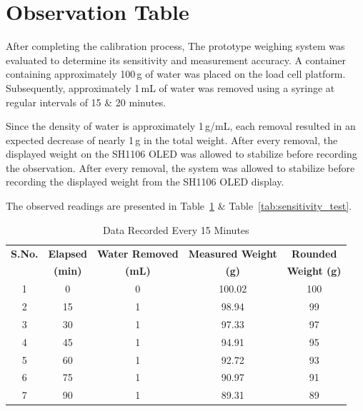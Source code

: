 \section{Observation Table}
After completing the calibration process, The prototype weighing system was evaluated to determine its sensitivity and measurement accuracy. A container containing approximately 100\,g of water was placed on the load cell platform. Subsequently, approximately 1\,mL of water was removed using a syringe at regular intervals of 15 \& 20 minutes.

Since the density of water is approximately 1\,g/mL, each removal resulted in an expected decrease of nearly 1\,g in the total weight. After every removal, the displayed weight on the SH1106 OLED was allowed to stabilize before recording the observation. After every removal, the system was allowed to stabilize before recording the displayed weight from the SH1106 OLED display.

The observed readings are presented in Table~\ref{tab:observation} \& Table~\ref{tab:sensitivity_test}.

\begin{table}[H]
\centering
\caption{Data Recorded Every 15 Minutes}
\label{tab:observation}

\begin{tabular}{|c|c|c|c|c|}
\hline
\textbf{S.No.} &
\textbf{Elapsed} &
\textbf{Water Removed} &
\textbf{Measured Weight} &
\textbf{Rounded} \\

&
\textbf{(min)} &
\textbf{(mL)} &
\textbf{(g)} &
\textbf{Weight (g)}\\
\hline

1 & 0  & 0 & 100.02 & 100 \\
2 & 15 & 1 & 98.94  & 99 \\
3 & 30 & 1 & 97.33  & 97 \\
4 & 45 & 1 & 94.91  & 95 \\
5 & 60 & 1 & 92.72  & 93 \\
6 & 75 & 1 & 90.97  & 91 \\
7 & 90 & 1 & 89.31  & 89 \\
\hline

\end{tabular}
\end{table}


